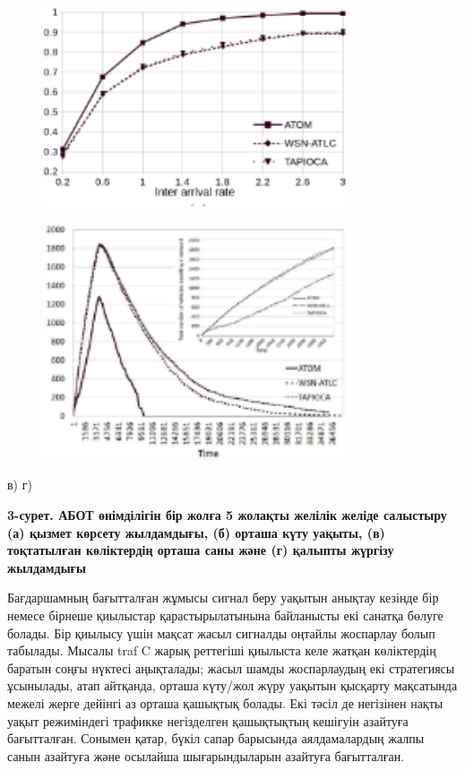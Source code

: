 \begin{figure}[H]
	\centering
	\includegraphics[width=0.8\textwidth]{assets/163}
	\caption*{}
\end{figure}
\begin{figure}[H]
	\centering
	\includegraphics[width=0.8\textwidth]{assets/164}
	\caption*{}
\end{figure}

в) г)

{\bfseries 3-сурет. АБОТ өнімділігін бір жолға 5 жолақты желілік желіде
салыстыру (а) қызмет көрсету жылдамдығы, (б) орташа күту уақыты, (в)
тоқтатылған көліктердің орташа саны және (г) қалыпты жүргізу жылдамдығы}

Бағдаршамның бағытталған жұмысы сигнал беру уақытын анықтау кезінде бір
немесе бірнеше қиылыстар қарастырылатынына байланысты екі санатқа бөлуге
болады. Бір қиылысу үшін мақсат жасыл сигналды оңтайлы жоспарлау болып
табылады. Мысалы traf C жарық реттегіші қиылыста келе жатқан көліктердің
баратын соңғы нүктесі аңықталады; жасыл шамды жоспарлаудың екі
стратегиясы ұсынылады, атап айтқанда, орташа күту/жол жүру уақытын
қысқарту мақсатында межелі жерге дейінгі аз орташа қашықтық болады. Екі
тәсіл де негізінен нақты уақыт режиміндегі трафикке негізделген
қашықтықтың кешігуін азайтуға бағытталған. Сонымен қатар, бүкіл сапар
барысында аялдамалардың жалпы санын азайтуға және осылайша
шығарындыларын азайтуға бағытталған.

